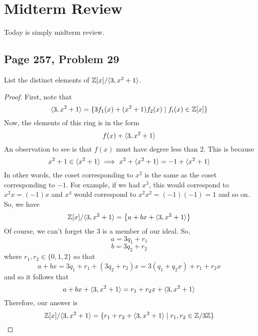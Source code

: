 \documentclass[letterpaper]{article}
\begin{document}
\section{Midterm Review}
Today is simply midterm review. 

\subsection{Page 257, Problem 29}
\begin{mdframed}[]
    List the distinct elements of $\mathbb{Z}[x] / \langle 3, x^2 + 1 \rangle$.
\end{mdframed}

\begin{proof}
    First, note that 
    \[\langle 3, x^2 + 1 \rangle = \{3 f_{1}(x) + (x^2 + 1)f_{2}(x) \mid f_{i}(x) \in \mathbb{Z}[x]\}\]
    Now, the elements of this ring is in the form 
    \[f(x) + \langle 3, x^2 + 1 \rangle\]
    An observation to see is that $f(x)$ must have degree less than 2. This is because 
    \[x^2 + 1 \in \langle x^2 + 1 \rangle \implies x^2 + \langle x^2 + 1 \rangle = -1 + \langle x^2 + 1 \rangle\]
    In other words, the coset corresponding to $x^2$ is the same as the coset corresponding to $-1$. For example, if we had $x^3$, this would correspond to $x^2 x = (-1)x$ and $x^4$ would correspond to $x^2 x^2 = (-1)(-1) = 1$ and so on. So, we have 
    \[\mathbb{Z}[x] / \langle 3, x^2 + 1 \rangle = \left\{a + bx + \langle 3, x^2 + 1 \rangle\right\}\]
    Of course, we can't forget the 3 is a member of our ideal. So, 
    \[a = 3q_1 + r_1\]
    \[b = 3q_2 + r_2\]
    where $r_1, r_2 \in \{0, 1, 2\}$ so that 
    \[a + bx = 3q_1 + r_1 + (3q_2 + r_2)x = 3(q_1 + q_2 x) + r_1 + r_2 x\]
    and so it follows that 
    \[a + bx + \langle 3, x^2 + 1 \rangle = r_1 + r_2 x + \langle 3, x^2 + 1 \rangle\]
    Therefore, our answer is 
    \[\mathbb{Z}[x] / \langle 3, x^2 + 1 \rangle = \{r_1 + r_2 + \langle 3, x^2 + 1 \rangle \mid r_1, r_2 \in \mathbb{Z} / 3\mathbb{Z}\}\]
\end{proof}
\end{document}
